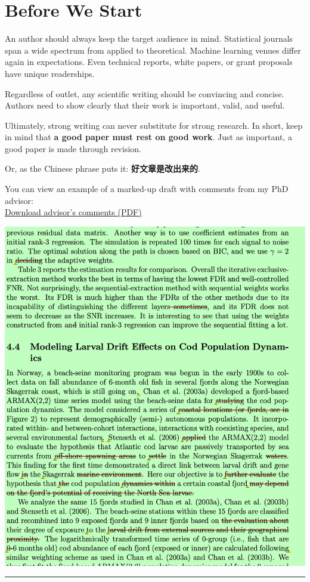 \documentclass[
]{book}
\theoremstyle{definition}
\theoremstyle{definition}
\theoremstyle{definition}
\theoremstyle{definition}
\theoremstyle{remark}
\begin{document}
\section{Before We Start}\label{before-we-start}

An author should always keep the target audience in mind. Statistical journals span a wide spectrum from applied to theoretical. Machine learning venues differ again in expectations. Even technical reports, white papers, or grant proposals have unique readerships.

Regardless of outlet, any scientific writing should be convincing and concise. Authors need to show clearly that their work is important, valid, and useful.

Ultimately, strong writing can never substitute for strong research. In short, keep in mind that \textbf{a good paper must rest on good work}. Just as important, a good paper is made through revision.

Or, as the Chinese phrase puts it: \textbf{好文章是改出来的}.

You can view an example of a marked-up draft with comments from my PhD advisor:\\
\href{files/ks-comments.pdf}{Download advisor's comments (PDF)}

\includegraphics[width=0.7\linewidth,height=\textheight,keepaspectratio]{files/ks-comments.png}

\begin{center}\rule{0.5\linewidth}{0.5pt}\end{center}
\end{document}
